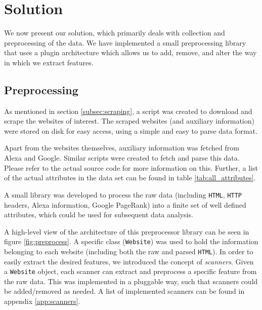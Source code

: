 \section{Solution}
\label{sec:solution}

We now present our solution, which primarily deals with collection and preprocessing of the data. We have implemented a small preprocessing library that uses a plugin architecture which allows us to add, remove, and alter the way in which we extract features.

\subsection{Preprocessing}
\label{subsec:preprocessing}


As mentioned in section \ref{subsec:scraping}, a script was created to download and scrape the websites of interest. The scraped websites (and auxiliary information) were stored on disk for easy access, using a simple and easy to parse data format.

Apart from the websites themselves, auxiliary information was fetched from Alexa and Google. Similar scripts were created to fetch and parse this data. Please refer to the actual source code for more information on this. Further, a list of the actual attributes in the data set can be found in table \ref{tab:all_attributes}.

A small library was developed to process the raw data (including \texttt{HTML}, \texttt{HTTP} headers, Alexa information, Google PageRank) into a finite set of well defined attributes, which could be used for subsequent data analysis.

A high-level view of the architecture of this preprocessor library can be seen in figure \ref{fig:preprocess}. A specific class (\texttt{Website}) was used to hold the information belonging to each website (including both the raw and parsed \texttt{HTML}). In order to easily extract the desired features, we introduced the concept of \textit{scanners}. Given a \texttt{Website} object, each scanner can extract and preprocess a specific feature from the raw data. This was implemented in a pluggable way, such that scanners could be added/removed as needed. A list of implemented scanners can be found in appendix \ref{app:scanners}.


